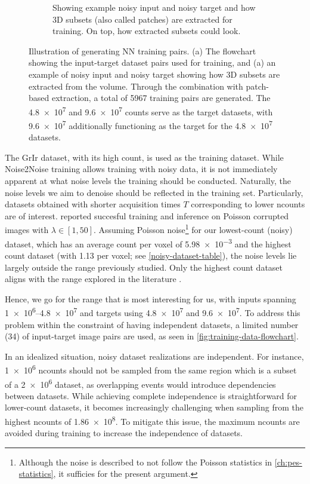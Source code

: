 \begin{figure}[h]
\begin{subfigure}[t]{0.39\linewidth}
        \caption{Showing example noisy input and noisy target and how 3D subsets (also called patches) are extracted for training. On top, how extracted subsets could look.}
        \label{fig:training-3d-patch-example}
    \end{subfigure}
    \caption{Illustration of generating \gls{NN} training pairs. (a) The flowchart showing the input-target dataset pairs used for training, and (a) an example of noisy input and noisy target showing how 3D subsets are extracted from the volume. Through the combination with patch-based extraction, a total of \num{5967} training pairs are generated. The \num{4.8e7} and \num{9.6e7} counts serve as the target datasets, with \num{9.6e7} additionally functioning as the target for the \num{4.8e7} datasets.}
\end{figure}
The \gls{GrIr} dataset, with its high count, is used as the training dataset. While Noise2Noise training allows training with noisy data, it is not immediately apparent at what noise levels the training should be conducted. Naturally, the noise levels we aim to denoise should be reflected in the training set. Particularly, datasets obtained with shorter acquisition times $T$ corresponding to lower \gls{ncounts} are of interest. \citeauthor{lehtinenNoise2NoiseLearningImage2018} reported succesful training and inference on Poisson corrupted images with $\lambda \in [1, 50]$. Assuming Poisson noise\footnote{Although the noise is described to not follow the Poisson statistics in \cref{ch:pes-statistics}, it sufficies for the present argument.} for our lowest-count (noisy) dataset, which has an average count per voxel of \num{5.98e-3} and the highest count dataset (with \num{1.13} per voxel; see \cref{noisy-dataset-table}), the noise levels lie largely outside the range previously studied. Only the highest count dataset aligns with the range explored in the literature \cite{lehtinenNoise2NoiseLearningImage2018}.

Hence, we go for the range that is most interesting for us, with inputs spanning \numrange{1e6}{4.8e7} and targets using \num{4.8e7} and \num{9.6e7}. To address this problem within the constraint of having independent datasets, a limited number (\num{34}) of input-target image pairs are used, as seen in \cref{fig:training-data-flowchart}. 

In an idealized situation, noisy dataset realizations are independent. For instance, \num{1e6} \gls{ncounts} should not be sampled from the same region which is a subset of a \num{2e6} dataset, as overlapping events would introduce dependencies between datasets. While achieving complete independence is straightforward for lower-count datasets, it becomes increasingly challenging when sampling from the highest \gls{ncounts} of \num{1.86e8}. To mitigate this issue, the maximum \gls{ncounts} are avoided during training to increase the independence of datasets. 

